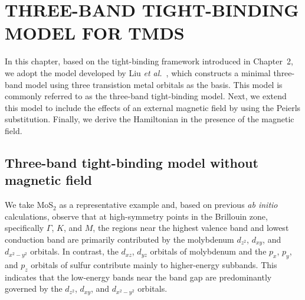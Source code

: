 \chapter{\textbf{\uppercase{Three-band Tight-binding Model for TMDs}}}
In this chapter, based on the tight-binding framework introduced in Chapter~2, we adopt the model developed by Liu \textit{et al.}~\cite{PhysRevB.88.085433}, which constructs a minimal three-band model using three transistion metal orbitals as the basis. This model is commonly referred to as the three-band tight-binding model. Next, we extend this model to include the effects of an external magnetic field by using the Peierls substitution. Finally, we derive the Hamiltonian in the presence of the magnetic field.
\section{Three-band tight-binding model without magnetic field}\label{Section 3.1}

We take MoS$_2$ as a representative example and, based on previous \textit{ab initio} calculations, observe that at high-symmetry points in the Brillouin zone, specifically $\Gamma$, $K$, and $M$, the regions near the highest valence band and lowest conduction band are primarily contributed by the molybdenum $d_{z^2}$, $d_{xy}$, and $d_{x^2 - y^2}$ orbitals. In contrast, the $d_{xz}$, $d_{yz}$ orbitals of molybdenum and the $p_x$, $p_y$, and $p_z$ orbitals of sulfur contribute mainly to higher-energy subbands. This indicates that the low-energy bands near the band gap are predominantly governed by the $d_{z^2}$, $d_{xy}$, and $d_{x^2 - y^2}$ orbitals.  

